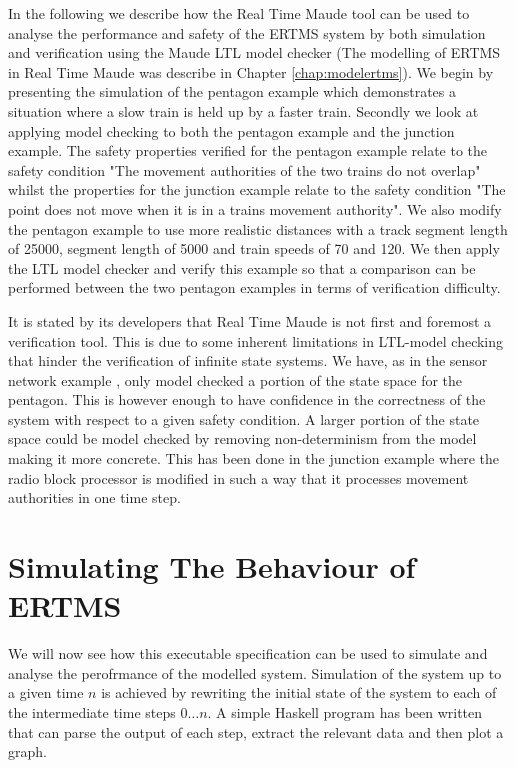 \label{chapter:verifyertms}\label{chap:verifyertms}
In the following we describe how the Real Time Maude tool can be used to analyse the performance and safety of the ERTMS system by both simulation and verification using the Maude LTL model checker (The modelling of ERTMS in Real Time Maude was describe in Chapter \ref{chap:modelertms}).  We begin by presenting the simulation of the pentagon example which demonstrates a situation where a slow train is held up by a faster train. Secondly we look at applying model checking to both the pentagon example and the junction example. The safety properties verified for the pentagon example relate to the safety condition "The movement authorities of the two trains do not overlap" whilst the properties for the junction example relate to the safety condition "The point does not move when it is in a trains movement authority". We also modify the pentagon example to use more realistic distances with a track segment length of 25000, segment length of 5000 and train speeds of 70 and 120.  We then apply the LTL model checker and verify this example so that a comparison can be performed between the two pentagon examples in terms of verification difficulty.

It is stated by its developers that Real Time Maude is not first and foremost a verification tool. This is due to some inherent limitations in LTL-model checking that hinder the verification of infinite state systems. We have, as in the sensor network example \cite{PO07}, only model checked a portion of the state space for the pentagon. This is however enough to have confidence in the correctness of the system with respect to a given safety condition. A larger portion of the state space could be model checked by removing non-determinism from the model making it more concrete. This has been done in the junction example where the radio block processor is modified in such a way that it processes movement authorities in one time step.


\section{Simulating The Behaviour of ERTMS}

We will now see how this executable specification can be used to simulate and analyse the perofrmance of the modelled system. Simulation of the system up to a given time $n$ is achieved by rewriting the initial state of the system to each of the intermediate time steps $0 \ldots n$. A simple Haskell program has been written that can parse the output of each step, extract the relevant data and then plot a graph.

